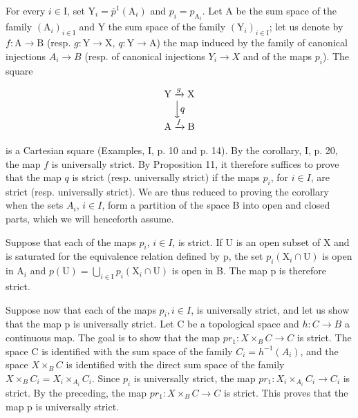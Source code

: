 For every \(i \in \mathrm{I}\), set \(\mathrm{Y}_i = \overline{p}^{1}(\mathrm{A}_i)\) and \(p_i = p_{\mathrm{A}_i}\). Let A be the sum space of the family \((\mathrm{A}_i)_{i \in \mathrm{I}}\) and Y the sum space of the family \((\mathrm{Y}_i)_{i \in \mathrm{I}}\); let us denote by \(f: \mathrm{A} \to \mathrm{B}\) (resp. \(g: \mathrm{Y} \to \mathrm{X}\), \(q: \mathrm{Y} \to \mathrm{A}\)) the map induced by the family of canonical injections \(A_i \rightarrow B\) (resp. of canonical injections \(Y_i \rightarrow X\) and of the maps \(p_i\)). The square

\[
\begin{array}{c} \mathrm{Y} \xrightarrow {g} \mathrm{X} \\ \Big \downarrow q \\ \mathrm{A} \xrightarrow {f} \mathrm{B} \end{array}
\]

is a Cartesian square (Examples, I, p. 10 and p. 14). By the corollary, I, p. 20, the map \(f\) is universally strict. By Proposition 11, it therefore suffices to prove that the map \(q\) is strict (resp. universally strict) if the maps \(p_i\), for \(i \in I\), are strict (resp. universally strict). We are thus reduced to proving the corollary when the sets \(A_i\), \(i \in I\), form a partition of the space B into open and closed parts, which we will henceforth assume.

Suppose that each of the maps \(p_i\), \(i \in I\), is strict. If U is an open subset of X and is saturated for the equivalence relation defined by p, the set \(p_i(\mathrm{X}_i \cap \mathrm{U})\) is open in \(\mathrm{A}_i\) and \(p(\mathrm{U}) = \bigcup_{i \in \mathrm{I}} p_i(\mathrm{X}_i \cap \mathrm{U})\) is open in B. The map p is therefore strict.

Suppose now that each of the maps \(p_{i}, i \in I\), is universally strict, and let us show that the map p is universally strict. Let C be a topological space and \(h: C \to B\) a continuous map. The goal is to show that the map \(pr_{1}: X \times_{B} C \to C\) is strict. The space C is identified with the sum space of the family \(C_{i} = h^{-1}(A_{i})\), and the space \(X \times_{B} C\) is identified with the direct sum space of the family \(X \times_{B} C_{i} = X_{i} \times_{A_{i}} C_{i}\). Since \(p_{i}\) is universally strict, the map \(pr_{1}: X_{i} \times_{A_{i}} C_{i} \to C_{i}\) is strict. By the preceding, the map \(pr_{1}: X \times_{B} C \to C\) is strict. This proves that the map p is universally strict.

